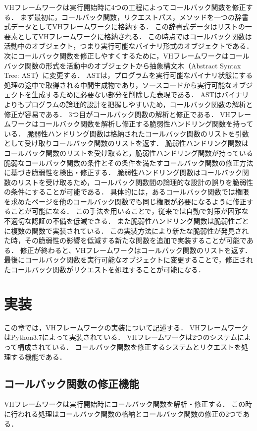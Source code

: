 \documentclass[a4paper,12pt]{jreport}
\begin{document}
VHフレームワークは実行開始時に4つの工程によってコールバック関数を修正する．
まず最初に，コールバック関数，リクエストパス，メソッドを一つの辞書式データとしてVHフレームワークに格納する．
この辞書式データはリストの一要素としてVHフレームワークに格納される．
この時点ではコールバック関数は活動中のオブジェクト，つまり実行可能なバイナリ形式のオブジェクトである．
次にコールバック関数を修正しやすくするために，VHフレームワークはコールバック関数の形式を活動中のオブジェクトから抽象構文木（Abstract Syntax Tree: AST）に変更する．
ASTは，プログラムを実行可能なバイナリ状態にする処理の途中で取得される中間生成物であり，ソースコードから実行可能なオブジェクトを生成するために必要ない部分を削除した表現である．
ASTはバイナリよりもプログラムの論理的設計を把握しやすいため，コールバック関数の解析と修正が容易である．
3つ目がコールバック関数の解析と修正である．
VHフレームワークはコールバック関数を解析し修正する脆弱性ハンドリング関数を持っている．
脆弱性ハンドリング関数は格納されたコールバック関数のリストを引数として受け取りコールバック関数のリストを返す．
脆弱性ハンドリング関数はコールバック関数のリストを受け取ると，脆弱性ハンドリング関数が持っている脆弱なコールバック関数の条件とその条件を満たすコールバック関数の修正方法に基づき脆弱性を検出・修正する．
脆弱性ハンドリング関数はコールバック関数のリストを受け取るため，コールバック関数間の論理的な設計の誤りを脆弱性の条件にすることが可能である．
具体的には，あるコールバック関数では権限を求めたページを他のコールバック関数でも同じ権限が必要になるように修正することが可能になる．
この手法を用いることで，従来では自動で対策が困難な不適切な認証の不備を低減できる．
また脆弱性ハンドリング関数は脆弱性ごとに複数の関数で実装されている．
この実装方法により新たな脆弱性が発見された時，その脆弱性の影響を低減する新たな関数を追加で実装することが可能である．
修正が終わると、VHフレームワークはコールバック関数のリストを返す．
最後にコールバック関数を実行可能なオブジェクトに変更することで，修正されたコールバック関数がリクエストを処理することが可能になる．

\chapter{実装}
この章では，VHフレームワークの実装について記述する．
VHフレームワークはPython3.7によって実装されている．
VHフレームワークは2つのシステムによって構成されている．
コールバック関数を修正するシステムとリクエストを処理する機能である．

\section{コールバック関数の修正機能}
VHフレームワークは実行開始時にコールバック関数を解析・修正する．
この時に行われる処理はコールバック関数の格納とコールバック関数の修正の2つである．
\end{document}
